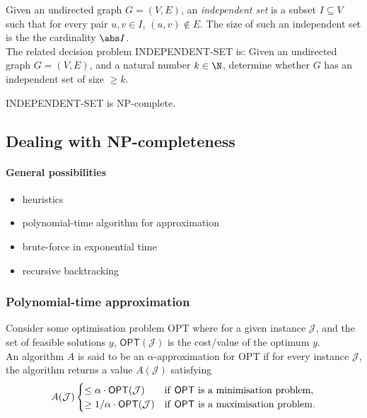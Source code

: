 \documentclass{article}
\begin{document}
\begin{definition}
	Given an undirected graph $G=(V,E)$, an \emph{independent set} is
	a subset $I\subseteq V$ such that for every pair $u,v\in I$,
	$(u,v)\not\in E$. The size of such an independent set is the
	the cardinality $\abs I$.\\
	The related decision problem INDEPENDENT-SET is: Given an undirected graph $G=(V,E)$,
	and a natural number $k\in\N$, determine whether $G$ has an independent
	set of size $\geq k$.
\end{definition}

\begin{proposition}
	INDEPENDENT-SET is NP-complete.
\end{proposition}


\subsection{Dealing with NP-completeness}


\paragraph{General possibilities}
\begin{itemize}
	\item heuristics
	\item polynomial-time algorithm for approximation
	\item brute-force in exponential time
	\item recursive backtracking
\end{itemize}

\subsubsection{Polynomial-time approximation}

\begin{definition}
	Consider some optimisation problem \textsf{OPT} where for a given 
	instance $\mathcal{J}$, and the set of feasible solutions $y$,
	$\textsf{OPT}(\mathcal{J})$ is the cost/value of the optimum $y$.\\
	An algorithm $A$ is said to be an $\alpha$-approximation for \textsf{OPT}
	if for every instance $\mathcal{J}$, the algorithm returns a value
	$A(\mathcal{J})$ satisfying
	\begin{align*}
		A(\mathcal{J}) \begin{cases}
			\leq \alpha \cdot \textsf{OPT}(\mathcal{J}) &\text{if \textsf{OPT} is a minimisation problem},\\
			\geq 1/\alpha \cdot \textsf{OPT}(\mathcal{J}) &\text{if \textsf{OPT} is a maximisation problem}.
		\end{cases}
	\end{align*}
\end{definition}
\end{document}
